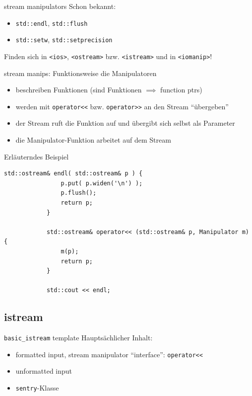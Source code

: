 \begin{frame}{stream manipulators}
	Schon bekannt:
	\begin{itemize}
		\item \texttt{std::endl}, \texttt{std::flush}
		\item \texttt{std::setw}, \texttt{std::setprecision}
	\end{itemize}
	
	\pause
	\vspace{2em}
	
	Finden sich in \texttt{<ios>}, \texttt{<ostream>} bzw. \texttt{<istream>} und in \texttt{<iomanip>}!
\end{frame}

\begin{frame}[fragile]{stream manips: Funktionsweise}
	\footnotesize
	die Manipulatoren
	\begin{itemize}
		\item beschreiben Funktionen (sind Funktionen $\implies$ function ptrs)
		\item werden mit \verb|operator<<| bzw. \verb|operator>>| an den Stream \enquote{übergeben}
		\item der Stream ruft die Funktion auf und übergibt sich selbst als Parameter
		\item die Manipulator-Funktion arbeitet auf dem Stream
	\end{itemize}
	
	\pause
	
	\begin{block}{Erläuterndes Beispiel}
		\begin{lstlisting}[basicstyle=\tiny, xleftmargin=3em]
			std::ostream& endl( std::ostream& p ) {
			    p.put( p.widen('\n') );
			    p.flush();
			    return p;
			}
			
			std::ostream& operator<< (std::ostream& p, Manipulator m) {
			    m(p);
			    return p;
			}
			
			std::cout << endl;
		\end{lstlisting}
	\end{block}
\end{frame}


\subsection{istream}

\begin{frame}{\texttt{basic\_istream} template}
	Hauptsächlicher Inhalt:
	\begin{itemize}
		\item formatted input, stream manipulator \enquote{interface}: \texttt{operator<<}
		\item unformatted input
		\item \texttt{sentry}-Klasse
	\end{itemize}
\end{frame}

